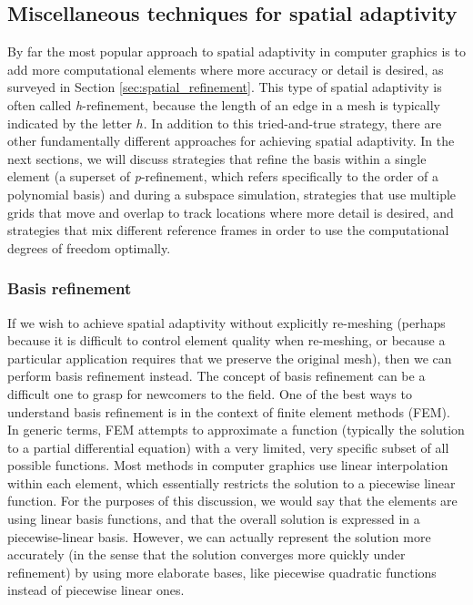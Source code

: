 \subsection{Miscellaneous techniques for spatial adaptivity} \label{sec pr adaptivity}

By far the most popular approach to spatial adaptivity in computer graphics is to add more computational elements where more accuracy or detail is desired, as surveyed in Section \ref{sec:spatial_refinement}. This type of spatial adaptivity is often called \textit{h}-refinement, because the length of an edge in a mesh is typically indicated by the letter $h$. In addition to this tried-and-true strategy, there are other fundamentally different approaches for achieving spatial adaptivity. In the next sections, we will discuss strategies that refine the basis within a single element (a superset of \textit{p}-refinement, which refers specifically to the order of a polynomial basis) and during a subspace simulation, strategies that use multiple grids that move and overlap to track locations where more detail is desired, and strategies that mix different reference frames in order to use the computational degrees of freedom optimally.

\subsubsection{Basis refinement}
\label{sec:basis_refinement}
If we wish to achieve spatial adaptivity without explicitly re-meshing (perhaps because it is difficult to control element quality when re-meshing, or because a particular application requires that we preserve the original mesh), then we can perform basis refinement instead. The concept of basis refinement can be a difficult one to grasp for newcomers to the field. One of the best ways to understand basis refinement is in the context of finite element methods (FEM). In generic terms, FEM attempts to approximate a function (typically the solution to a partial differential equation) with a very limited, very specific subset of all possible functions. Most methods in computer graphics use linear interpolation within each element, which essentially restricts the solution to a piecewise linear function. For the purposes of this discussion, we would say that the elements are using linear basis functions, and that the overall solution is expressed in a piecewise-linear basis. However, we can actually represent the solution more accurately (in the sense that the solution converges more quickly under refinement) by using more elaborate bases, like piecewise quadratic functions instead of piecewise linear ones.


